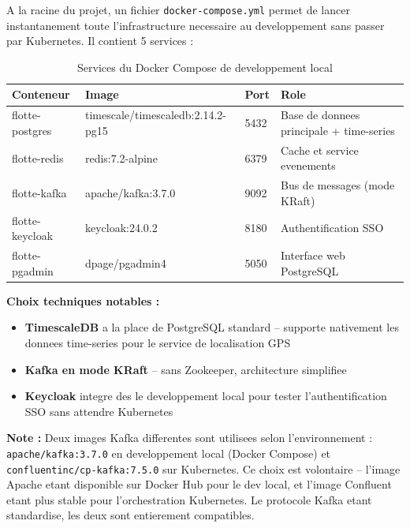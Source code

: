 \documentclass[12pt,a4paper]{article}
\begin{document}
\vspace{0.3cm}

A la racine du projet, un fichier \texttt{docker-compose.yml} permet de lancer
instantanement toute l'infrastructure necessaire au developpement sans passer par
Kubernetes. Il contient 5 services :

\begin{table}[H]
  \centering
  \begin{tabular}{llll}
    \toprule
    \textbf{Conteneur} & \textbf{Image} & \textbf{Port} & \textbf{Role} \\
    \midrule
    flotte-postgres  & timescale/timescaledb:2.14.2-pg15    & 5432 & Base de donnees principale + time-series \\
    flotte-redis     & redis:7.2-alpine                     & 6379 & Cache et service evenements \\
    flotte-kafka     & apache/kafka:3.7.0                   & 9092 & Bus de messages (mode KRaft) \\
    flotte-keycloak  & keycloak:24.0.2  & 8180 & Authentification SSO \\
    flotte-pgadmin   & dpage/pgadmin4                       & 5050 & Interface web PostgreSQL \\
    \bottomrule
  \end{tabular}
  \caption{Services du Docker Compose de developpement local}
\end{table}

\textbf{Choix techniques notables :}
\begin{itemize}
  \item \textbf{TimescaleDB} a la place de PostgreSQL standard -- supporte nativement
        les donnees time-series pour le service de localisation GPS
  \item \textbf{Kafka en mode KRaft} -- sans Zookeeper, architecture simplifiee
  \item \textbf{Keycloak} integre des le developpement local pour tester
        l'authentification SSO sans attendre Kubernetes
\end{itemize}

\begin{infobox}
\textbf{Note :} Deux images Kafka differentes sont utilisees selon l'environnement :
\texttt{apache/kafka:3.7.0} en developpement local (Docker Compose) et
\texttt{confluentinc/cp-kafka:7.5.0} sur Kubernetes. Ce choix est volontaire --
l'image Apache etant disponible sur Docker Hub pour le dev local, et l'image
Confluent etant plus stable pour l'orchestration Kubernetes. Le protocole Kafka
etant standardise, les deux sont entierement compatibles.
\end{infobox}
\end{document}
